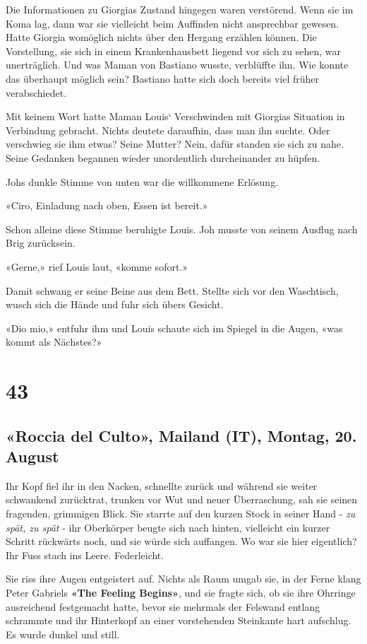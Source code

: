 Die Informationen zu Giorgias Zustand hingegen waren verstörend. Wenn
sie im Koma lag, dann war sie vielleicht beim Auffinden nicht
ansprechbar gewesen. Hatte Giorgia womöglich nichts über den Hergang
erzählen können. Die Vorstellung, sie sich in einem Krankenhausbett
liegend vor sich zu sehen, war unerträglich. Und was Maman von Bastiano
wusste, verblüffte ihn. Wie konnte das überhaupt möglich sein? Bastiano
hatte sich doch bereits viel früher verabschiedet.

Mit keinem Wort hatte Maman Louis` Verschwinden mit Giorgias Situation
in Verbindung gebracht. Nichts deutete daraufhin, dass man ihn suchte.
Oder verschwieg sie ihm etwas? Seine Mutter? Nein, dafür standen sie
sich zu nahe. Seine Gedanken begannen wieder unordentlich durcheinander
zu hüpfen.

Johs dunkle Stimme von unten war die willkommene Erlösung.

«Ciro, Einladung nach oben, Essen ist bereit.»

Schon alleine diese Stimme beruhigte Louis. Joh musste von seinem
Ausflug nach Brig zurücksein.

«Gerne,» rief Louis laut, «komme sofort.»

Damit schwang er seine Beine aus dem Bett. Stellte sich vor den
Waschtisch, wusch sich die Hände und fuhr sich übers Gesicht.

«Dio mio,» entfuhr ihm und Louis schaute sich im Spiegel in die Augen,
«was kommt als Nächstes?»

\chapter{43}\label{section-42}

\section{«Roccia del Culto», Mailand (IT), Montag, 20.
August}\label{roccia-del-culto-mailand-it-montag-20.-august}

Ihr Kopf fiel ihr in den Nacken, schnellte zurück und während sie weiter
schwankend zurücktrat, trunken vor Wut und neuer Überraschung, sah sie
seinen fragenden, grimmigen Blick. Sie starrte auf den kurzen Stock in
seiner Hand - \emph{zu spät, zu spät} - ihr Oberkörper beugte sich nach
hinten, vielleicht ein kurzer Schritt rückwärts noch, und sie würde sich
auffangen. Wo war sie hier eigentlich? Ihr Fuss stach ins Leere.
Federleicht.

Sie riss ihre Augen entgeistert auf. Nichts als Raum umgab sie, in der
Ferne klang Peter Gabriels \textbf{«The Feeling Begins»}, und sie fragte
sich, ob sie ihre Ohrringe ausreichend festgemacht hatte, bevor sie
mehrmals der Felswand entlang schrammte und ihr Hinterkopf an einer
vorstehenden Steinkante hart aufschlug. Es wurde dunkel und still.

